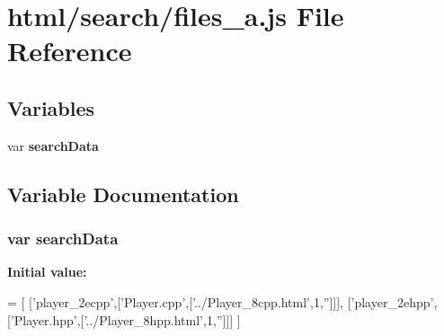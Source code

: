 \section{html/search/files\-\_\-a.js File Reference}
\label{files__a_8js}
\subsection*{Variables}
\begin{DoxyCompactItemize}
\item 
var {\bf search\-Data}
\end{DoxyCompactItemize}


\subsection{Variable Documentation}
\subsubsection[{search\-Data}]{\setlength{\rightskip}{0pt plus 5cm}var search\-Data}\label{files__a_8js_ad01a7523f103d6242ef9b0451861231e}
{\bfseries Initial value\-:}
\begin{DoxyCode}
=
[
  [\textcolor{stringliteral}{'player\_2ecpp'},[\textcolor{stringliteral}{'Player.cpp'},[\textcolor{stringliteral}{'../Player\_8cpp.html'},1,\textcolor{stringliteral}{''}]]],
  [\textcolor{stringliteral}{'player\_2ehpp'},[\textcolor{stringliteral}{'Player.hpp'},[\textcolor{stringliteral}{'../Player\_8hpp.html'},1,\textcolor{stringliteral}{''}]]]
]
\end{DoxyCode}
